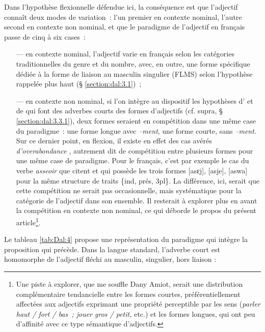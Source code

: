 \documentclass[output=paper]{langsci/langscibook}
\begin{document}
Dans l'hypothèse flexionnelle défendue ici, la conséquence est que l'adjectif connaît deux modes de variation~: l'un premier en contexte nominal, l'autre second en contexte non nominal, et que le paradigme de l'adjectif en français passe de cinq à six cases~:

\begin{itemize}
\item[---] en contexte nominal, l'adjectif varie en français selon les catégories traditionnelles du genre et du nombre, avec, en outre, une forme spécifique dédiée à la forme de liaison au masculin singulier (FLMS) selon l'hypothèse %
\citet{Bonami05} %
%
rappelée plus haut (§ \ref{section:dal:3.1})~;

\item[---] en contexte non nominal, si l'on intègre au dispositif les hypothèses d'%
\citet{Abeille04} %
%
et de %
\citet{Hummel13,Hummel14} %
%
qui font des adverbes courts des formes d'adjectifs (cf. supra, § \ref{section:dal:3.3.1}), deux formes seraient en compétition dans une même case du paradigme~: une forme longue avec \emph{--ment}, une forme courte, sans \emph{--ment}. Sur ce dernier point, en flexion, il existe en effet des cas avérés \emph{d'overabondance} %
\citep[cf. ][]{Thornton12}%
%
, autrement dit de compétition entre plusieurs formes pour une même case de paradigme. Pour le français, c'est par exemple le cas du verbe \emph{asseoir} que citent %
\citet{Apotheloz04} %
%
et qui possède les trois formes {[}asɛj{]}, {[}asje{]}, {[}aswa{]} pour la même structure de traits \{ind, prés, 3pl\}. La différence, ici, serait que cette compétition ne serait pas occasionnelle, mais systématique pour la catégorie de l'adjectif dans son ensemble. Il resterait à explorer plus en avant la compétition en contexte non nominal, ce qui déborde le propos du présent article\footnote{Une piste à explorer, que me souffle Dany Amiot, serait une distribution complémentaire tendancielle entre les formes courtes, préférentiellement affectées aux adjectifs exprimant une propriété perceptible par les sens (\emph{parler haut / fort / bas~; jouer gros / petit,} etc.) et les formes longues, qui ont peu d'affinité avec ce type sémantique d'adjectifs.}.
\end{itemize}

Le tableau \ref{tab:Dal:4} propose une représentation du paradigme qui intègre la proposition qui précède. Dans la langue standard, l'adverbe court est homomorphe de l'adjectif fléchi au masculin, singulier, hors liaison :
\end{document}
